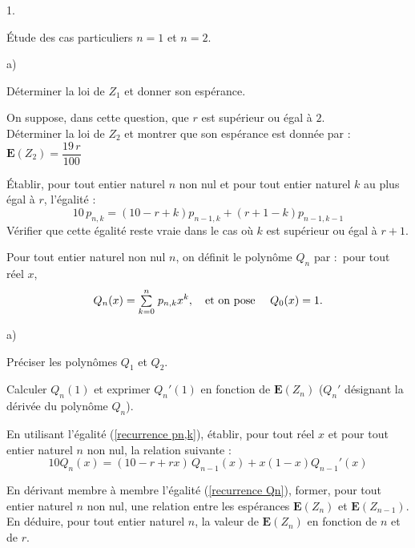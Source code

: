 \documentclass[11pt]{article}%
\begin{document}
\begin{noliste}{1.}
 \setlength{\itemsep}{4mm}
\item Étude des cas particuliers $n = 1$ et $n = 2$.

\begin{noliste}{a)}
 \setlength{\itemsep}{2mm}
\item Déterminer la loi de $Z_{1}$ et donner son espérance.

\item On suppose, dans cette question, que $r$ est supérieur ou égal à
$2$. 
\\
Déterminer la loi de $Z_{2}$ et montrer que son espérance est donnée
par :
\quad $\mathbf{E}(Z_{2}) = \dfrac{19\,r}{100}$
\end{noliste}

\item Établir, pour tout entier naturel $n$ non nul et pour tout entier
naturel $k$ au plus égal à $r$, l'égalité : 
\begin{equation}
10\,p_{n,k} = (10-r + k)p_{n-1,k} + (r + 1-k)p_{n-1,k-1}
\label{recurrence pn,k}
\end{equation}Vérifier que cette égalité reste vraie dans le cas où $k$
est supérieur ou égal à $r + 1$.

\item Pour tout entier naturel non nul $n$, on définit le polynôme
$Q_{n}$
par :\ pour tout réel $x$, 
\[
Q_{n}(x) = {\textstyle\sum\limits_{k = 0}^{n}}\hspace{.1cm}p_{n,k}x^{k},\quad \text{et on pose}\quad \
Q_{0}(x) = 1.
\]

\begin{noliste}{a)}
 \setlength{\itemsep}{2mm}
\item Préciser les polynômes $Q_{1}$ et $Q_{2}$.

\item Calculer $Q_{n}(1)$ et exprimer $Q_{n}{\prime }(1)$ en fonction
de $\mathbf{E}(Z_{n})$ ($Q_{n}{\prime }$ désignant la dérivée du
polynôme $Q_{n} $).

\item En utilisant l'égalité (\ref{recurrence pn,k}), établir, pour
tout réel $x$ et pour tout entier naturel $n$ non nul, la relation
suivante : 
\begin{equation}
10Q_{n}(x) = (10-r + rx)\,Q_{n-1}(x) + x(1-x)Q_{n-1}{\prime }(x)
\label{recurrence Qn}
\end{equation}

\item En dérivant membre à membre l'égalité (\ref{recurrence Qn}),
former,
pour tout entier naturel $n$ non nul, une relation entre les espérances
$\mathbf{E}(Z_{n})$ et $\mathbf{E}(Z_{n-1})$.\\
En déduire, pour tout entier naturel $n$, la valeur de
$\mathbf{E}(Z_{n})$
en fonction de $n$ et de $r$.
\end{noliste}


\end{noliste}
\end{document}
